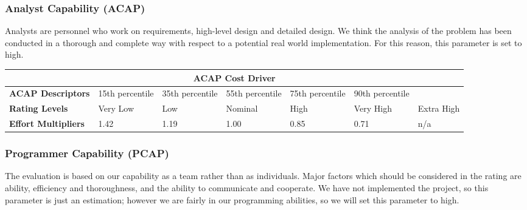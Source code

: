 \subsubsection*{Analyst Capability (ACAP)}
Analysts are personnel who work on requirements, high-level design and detailed design. We think the analysis of the problem has been conducted in a thorough and complete way with respect to a potential real world implementation. For this reason, this parameter is set to high.

\begin{table}[H]
	\centering
	\begin{tabular}{| m{1.8cm} | m{1.6cm} | m{1.6cm} | m{1.6cm} | m{1.6cm} | m{1.6cm} | m{0.9cm} | }
		\hline
		\multicolumn{7}{|c|}{ \textbf{ACAP Cost Driver} } \\
		\hline
		\hline
		\textbf{ACAP Descriptors} & 15th \newline percentile & 35th \newline percentile & 55th \newline percentile & 75th \newline percentile & 90th \newline percentile & \\
		\hline
		\textbf{Rating Levels} & Very Low & Low & Nominal & High & Very High & Extra High \\
		\hline
		\textbf{Effort Multipliers} & 1.42 & 1.19 & 1.00 & 0.85 & 0.71 & n/a \\ 
		\hline
	\end{tabular}
\end{table}
\newpage
\subsubsection*{Programmer Capability (PCAP)}
The evaluation is based on our capability as a team rather than as individuals. Major factors which should be considered in the rating are ability, efficiency and thoroughness, and the ability to communicate and cooperate. We have not implemented the project, so this parameter is just an estimation; however we are fairly in our programming abilities, so we will set this parameter to high.

